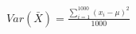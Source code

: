 \documentclass[preview]{standalone}
\begin{document}
\begin{align*}
Var(\bar{X}) = \frac{\sum_{i=1}^{1000}(x_i - \mu)^2}{1000}
\end{align*}
\end{document}
